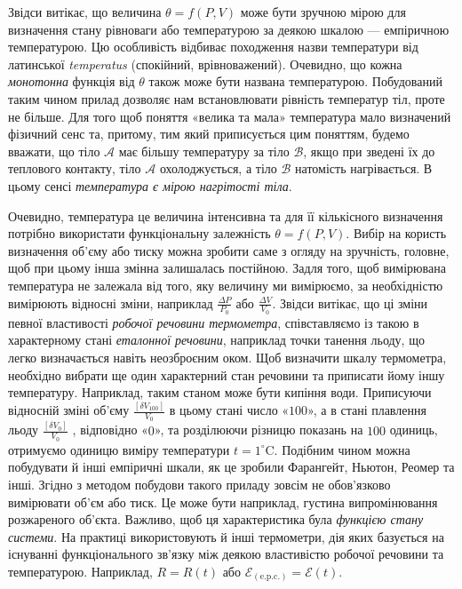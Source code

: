 Звідси витікає, що величина $\theta = f(P, V)$ може бути зручною мірою для визначення стану рівноваги або температурою за деякою шкалою --- емпіричною температурою. Цю особливість відбиває походження назви температури від латинської \emph{temperatus} (спокійний, врівноважений). Очевидно, що кожна \emph{монотонна} функція від $\theta$ також може бути названа температурою. Побудований таким чином прилад дозволяє нам встановлювати рівність температур тіл, проте не більше. Для того щоб поняття «велика та мала» температура мало визначений фізичний сенс та, притому, тим який приписується цим поняттям, будемо вважати, що тіло $\mathcal{A}$ має більшу температуру за тіло $\mathcal{B}$, якщо при зведені їх до теплового контакту, тіло $\mathcal{A}$ охолоджується, а тіло $\mathcal{B}$ натомість нагрівається. В цьому сенсі \emph{температура є мірою нагрітості тіла}.

Очевидно, температура це величина інтенсивна та для її кількісного визначення потрібно використати функціональну залежність $\theta = f(P, V)$. Вибір на користь визначення об'єму або тиску можна зробити саме з огляду на зручність, головне, щоб при цьому інша змінна залишалась постійною. Задля того, щоб вимірювана температура не залежала від того, яку величину ми вимірюємо, за необхідністю вимірюють відносні зміни, наприклад $\frac{\Delta P}{P_0}$  або  $\frac{\Delta V}{V_0}$. Звідси витікає, що ці зміни певної властивості \emph{робочої речовини термометра}, співставляємо із такою в характерному стані \emph{еталонної речовини}, наприклад точки танення льоду, що легко визначається навіть неозброєним оком. Щоб визначити шкалу термометра, необхідно вибрати ще один характерний стан речовини та приписати йому іншу температуру. Наприклад, таким станом може бути кипіння води. Приписуючи відносній зміні об’єму $\frac{[\delta V_{100}]}{V_0}$  в цьому стані число «$100$», а в стані плавлення льоду $\frac{[\delta V_{0}]}{V_0}$ , відповідно «$0$», та розділюючи різницю показань на $100$ одиниць, отримуємо одиницю виміру температури $t = 1^\circ$C. Подібним чином можна побудувати й інші емпіричні шкали, як це зробили Фарангейт, Ньютон, Реомер та інші. Згідно з методом побудови такого приладу зовсім не обов'язково вимірювати об'єм або тиск. Це може бути наприклад, густина випромінювання розжареного об'єкта. Важливо, щоб ця характеристика була \emph{функцією стану системи}. На практиці використовують й інші термометри, дія яких базується на існуванні функціонального зв'язку між деякою властивістю робочої речовини та температурою. Наприклад, $R=R(t)$  або $\mathcal{E}_(\text{e.p.c.})=\mathcal{E}(t)$.





